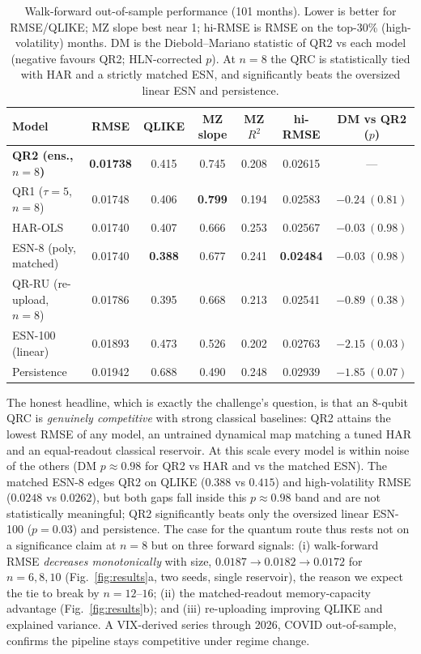 \documentclass[11pt]{article}
\begin{document}
\begin{table}[t]
\centering
\small
\caption{Walk-forward out-of-sample performance (101 months). Lower is better for RMSE/QLIKE; MZ slope best near 1; hi-RMSE is RMSE on the top-30\% (high-volatility) months. DM is the Diebold--Mariano statistic of QR2 vs each model (negative favours QR2; HLN-corrected $p$). At $n{=}8$ the QRC is statistically tied with HAR and a strictly matched ESN, and significantly beats the oversized linear ESN and persistence.}
\label{tab:results}
\begin{tabular}{lcccccc}
\toprule
Model & RMSE & QLIKE & MZ slope & MZ $R^2$ & hi-RMSE & DM vs QR2 ($p$)\\
\midrule
\textbf{QR2 (ens., $n{=}8$)}   & \textbf{0.01738} & 0.415 & 0.745 & 0.208 & 0.02615 & --- \\
QR1 ($\tau{=}5$, $n{=}8$)      & 0.01748 & 0.406 & \textbf{0.799} & 0.194 & 0.02583 & $-0.24\ (0.81)$ \\
HAR-OLS                        & 0.01740 & 0.407 & 0.666 & 0.253 & 0.02567 & $-0.03\ (0.98)$ \\
ESN-8 (poly, matched)          & 0.01740 & \textbf{0.388} & 0.677 & 0.241 & \textbf{0.02484} & $-0.03\ (0.98)$ \\
QR-RU (re-upload, $n{=}8$)     & 0.01786 & 0.395 & 0.668 & 0.213 & 0.02541 & $-0.89\ (0.38)$ \\
ESN-100 (linear)               & 0.01893 & 0.473 & 0.526 & 0.202 & 0.02763 & $-2.15\ (0.03)$ \\
Persistence                    & 0.01942 & 0.688 & 0.490 & 0.248 & 0.02939 & $-1.85\ (0.07)$ \\
\bottomrule
\end{tabular}
\end{table}

The honest headline, which is exactly the challenge's question, is that an 8-qubit QRC is \emph{genuinely competitive} with strong classical baselines: QR2 attains the lowest RMSE of any model, an untrained dynamical map matching a tuned HAR and an equal-readout classical reservoir. At this scale every model is within noise of the others (DM $p\approx0.98$ for QR2 vs HAR and vs the matched ESN). The matched ESN-8 edges QR2 on QLIKE ($0.388$ vs $0.415$) and high-volatility RMSE ($0.0248$ vs $0.0262$), but both gaps fall inside this $p\approx0.98$ band and are not statistically meaningful; QR2 significantly beats only the oversized linear ESN-100 ($p=0.03$) and persistence. The case for the quantum route thus rests not on a significance claim at $n{=}8$ but on three forward signals: (i) walk-forward RMSE \emph{decreases monotonically} with size, $0.0187\to0.0182\to0.0172$ for $n=6,8,10$ (Fig.~\ref{fig:results}a, two seeds, single reservoir), the reason we expect the tie to break by $n=12$--$16$; (ii) the matched-readout memory-capacity advantage (Fig.~\ref{fig:results}b); and (iii) re-uploading improving QLIKE and explained variance. A VIX-derived series through 2026, COVID out-of-sample, confirms the pipeline stays competitive under regime change.
\end{document}
